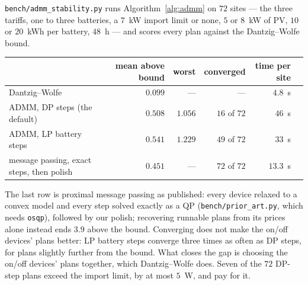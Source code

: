\documentclass[11pt,a4paper]{article}
\begin{document}
\texttt{bench/admm\_stability.py} runs Algorithm~\ref{alg:admm} on $72$ sites ---
the three tariffs, one to three batteries, a $7$~kW import limit or none, $5$ or
$8$~kW of PV, $10$ or $20$~kWh per battery, $48$~h --- and scores every plan
against the Dantzig--Wolfe bound.
\begin{center}
\small
\begin{tabular}{lrrrrr}
\toprule
& mean above bound & worst & converged & time per site \\
\midrule
Dantzig--Wolfe                               & $0.099$ & ---     & ---          & $4.8$~s \\
ADMM, DP steps (the default)                 & $0.508$ & $1.056$ & $16$ of $72$ & $46$~s \\
ADMM, LP battery steps                       & $0.541$ & $1.229$ & $49$ of $72$ & $33$~s \\
message passing, exact steps, then polish    & $0.451$ & ---     & $72$ of $72$ & $13.3$~s \\
\bottomrule
\end{tabular}
\end{center}
The last row is proximal message passing as published: every device relaxed to a
convex model and every step solved exactly as a QP (\texttt{bench/prior\_art.py},
which needs \texttt{osqp}), followed by our polish; recovering runnable plans from
its prices alone instead ends $3.9$ above the bound. Converging does not make the
on/off devices' plans better: LP battery steps converge three times as often as DP
steps, for plans slightly further from the bound. What closes the gap is choosing
the on/off devices' plans together, which Dantzig--Wolfe does. Seven of the $72$
DP-step plans exceed the import limit, by at most $5$~W, and pay for it.
\end{document}
